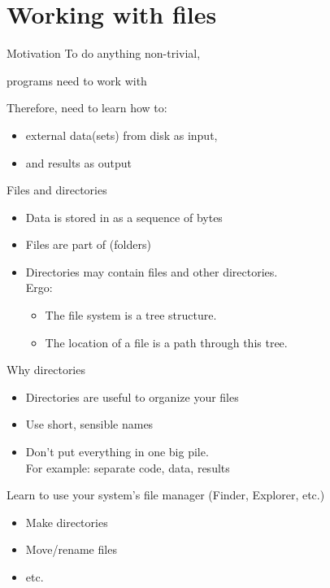 \documentclass[aspectratio=169,usenames,dvipsnames]{beamer}
\begin{document}
\section{Working with files}
\frame{\tableofcontents[currentsection]}

\begin{frame}{Motivation}
    To do anything non-trivial,

    programs need to work with 

    \pause
    Therefore, need to learn how to:

	\begin{itemize}
		\item {} external data(sets) from disk as input,
		\item and  results as output
	\end{itemize}

\end{frame}


\begin{frame}{Files and directories}
    \begin{itemize}
        \item Data is stored in  as a sequence of bytes
        \item Files are part of  (folders)
        \item Directories may contain files and other directories.\\
            Ergo:
            \begin{itemize}
                \item The file system is a tree structure.
                \item The location of a file is a path through this tree.
            \end{itemize}
    \end{itemize}
\end{frame}

\begin{frame}{Why directories}
    \begin{itemize}
        \item Directories are useful to organize your files
        \item Use short, sensible names
        \item Don't put everything in one big pile. \\
            For example: separate code, data, results
    \end{itemize}
    \pause 
    Learn to use your system's file manager (Finder, Explorer, etc.)
    \begin{itemize}
        \item Make directories
        \item Move/rename files
        \item etc.
    \end{itemize}
    
\end{frame}
\end{document}

